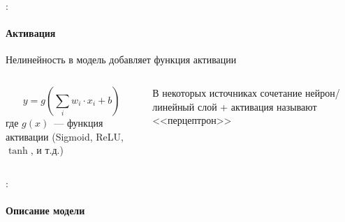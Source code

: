 \documentclass{beamer}
\begin{document}
\begin{frame}{\secname : \subsecname}
  \framesubtitle{Активация}
  Нелинейность в модель добавляет функция активации

  \begin{columns}

    \begin{column}{0.5\textwidth}

      $$
      y = g\left(\sum_{i}^{} w_i \cdot x_i + b\right)
      $$
      где $g(x)$~--- функция активации (Sigmoid, ReLU, $\tanh$, и т.д.)

    \end{column}

    \begin{column}{0.5\textwidth}
      \begin{center}
      \end{center}
      В некоторых источниках сочетание нейрон/линейный слой +
      активация называют <<перцептрон>>
    \end{column}

  \end{columns}
\end{frame}

\begin{frame}{\secname : \subsecname}
  \framesubtitle{Описание модели}
  \inputminted[firstline=19,lastline=30]{python}{linear_regression_3/linear_regression_3.py}
\end{frame}
\end{document}
